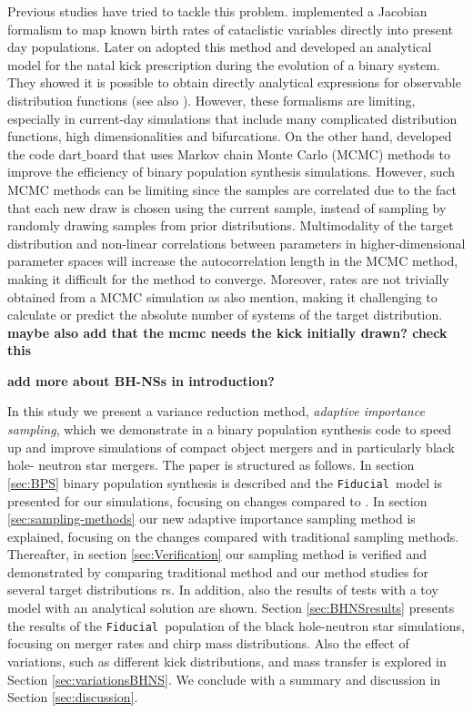 \documentclass[a4paper,fleqn,usenatbib]{mnras}
\newcommand{\floor}[1]{\textbf{\textcolor{ochre}{#1}}}
\newcommand\Fiducial{\texttt{Fiducial }}
\begin{document}
Previous studies have tried to tackle this problem. 
\citet{kolb1993model, politano1996theoretical} implemented a Jacobian formalism to map known birth rates of cataclistic variables directly into present day populations. Later on \citet{kalogera1996orbital} adopted this method and developed an analytical model for the natal kick prescription during the evolution of a binary system. They showed it is possible to obtain directly analytical expressions for observable distribution functions (see also \citealt{kalogera1998formation,kalogera2000spin}). However, these formalisms are limiting, especially in current-day simulations that include many complicated distribution functions, high dimensionalities and bifurcations.
On the other hand, \citet{andrews2017dart_board} developed the code dart$\_$board that uses Markov chain Monte Carlo (MCMC) methods to improve the efficiency of binary population synthesis simulations. However, such MCMC methods can be limiting since the samples are correlated due to the fact that each new draw is chosen using the current sample, instead of sampling by randomly drawing samples from prior distributions. Multimodality of the target distribution and non-linear correlations between parameters in higher-dimensional parameter spaces will increase the autocorrelation length in the MCMC method, making it difficult for the method to converge. Moreover,  rates  are not trivially obtained from a MCMC simulation as  \citet{andrews2017dart_board} also mention, making it challenging to calculate or predict the absolute number of systems of the target distribution. \floor{maybe also add that the mcmc needs the kick initially drawn? check this}
 


\floor{add more about BH-NSs in introduction?}

In this study we present a variance reduction method, \emph{adaptive importance sampling}, which we demonstrate in a binary population synthesis code to speed up and improve simulations of compact object mergers and in particularly black hole- neutron star mergers. The paper is structured as follows. In section \ref{sec:BPS} binary population synthesis is described and the \Fiducial model is presented for our simulations, focusing on changes compared to \citep{vigna2018formation}. In section \ref{sec:sampling-methods} our new adaptive importance sampling method is explained, focusing on the changes compared with traditional sampling methods. Thereafter, in section \ref{sec:Verification} our sampling method is verified and demonstrated by comparing traditional method and our method studies for several target distributions rs. In addition, also the results of tests with a toy model with an analytical solution are shown. Section \ref{sec:BHNSresults} presents the results of the \Fiducial population of the black hole-neutron star simulations, focusing on merger rates and chirp mass distributions. Also the effect of variations, such as different kick distributions, and mass transfer is explored in Section \ref{sec:variationsBHNS}. We conclude with a summary and discussion in Section \ref{sec:discussion}. 
\end{document}
